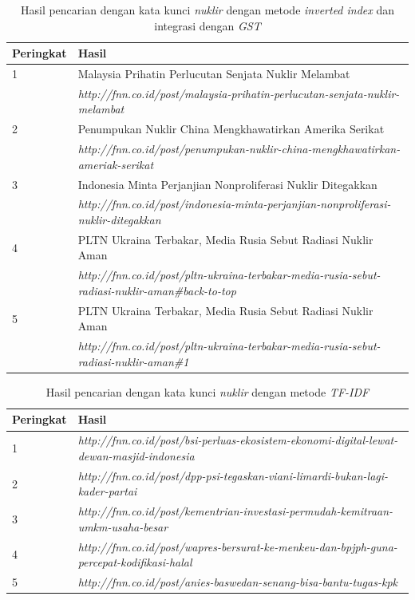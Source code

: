 \begin{table}[H]
\begin{center}
  \caption{\label{tabel:hasil_gst_nuklir} Hasil pencarian dengan kata kunci
  \textit{nuklir} dengan metode \textit{inverted index} dan integrasi dengan
  \textit{GST}}
  \begin{tabular}{|p{0.7in}|p{4.5in}|} 
 \hline
  Peringkat & Hasil \\ 
 \hline
  1 & Malaysia Prihatin Perlucutan Senjata Nuklir Melambat \\ 
   & \textit{http://fnn.co.id/post/malaysia-prihatin-perlucutan-senjata-nuklir-melambat} \\
 \hline
  2 & Penumpukan Nuklir China Mengkhawatirkan Amerika Serikat \\
   & \textit{http://fnn.co.id/post/penumpukan-nuklir-china-mengkhawatirkan-ameriak-serikat} \\
 \hline
  3 & Indonesia Minta Perjanjian Nonproliferasi Nuklir Ditegakkan \\
   & \textit{http://fnn.co.id/post/indonesia-minta-perjanjian-nonproliferasi-nuklir-ditegakkan} \\
 \hline
  4 & PLTN Ukraina Terbakar, Media Rusia Sebut Radiasi Nuklir Aman \\
   & \textit{http://fnn.co.id/post/pltn-ukraina-terbakar-media-rusia-sebut-radiasi-nuklir-aman\#back-to-top} \\
 \hline
  5 & PLTN Ukraina Terbakar, Media Rusia Sebut Radiasi Nuklir Aman \\
   & \textit{http://fnn.co.id/post/pltn-ukraina-terbakar-media-rusia-sebut-radiasi-nuklir-aman\#1} \\
 \hline
\end{tabular}
\end{center}
\end{table}

\begin{table}[H]
\begin{center}
  \caption{\label{tabel:hasil_tfidf_nuklir} Hasil pencarian dengan kata kunci
  \textit{nuklir} dengan metode \textit{TF-IDF}}
  \begin{tabular}{|p{0.7in}|p{4.5in}|} 
 \hline
  Peringkat & Hasil \\ 
 \hline
    1 & \textit{http://fnn.co.id/post/bsi-perluas-ekosistem-ekonomi-digital-lewat-dewan-masjid-indonesia} \\ 
 \hline
    2 & \textit{http://fnn.co.id/post/dpp-psi-tegaskan-viani-limardi-bukan-lagi-kader-partai} \\
 \hline
    3 & \textit{http://fnn.co.id/post/kementrian-investasi-permudah-kemitraan-umkm-usaha-besar} \\
 \hline
    4 & \textit{http://fnn.co.id/post/wapres-bersurat-ke-menkeu-dan-bpjph-guna-percepat-kodifikasi-halal} \\
 \hline
    5 & \textit{http://fnn.co.id/post/anies-baswedan-senang-bisa-bantu-tugas-kpk} \\
 \hline
\end{tabular}
\end{center}
\end{table}

